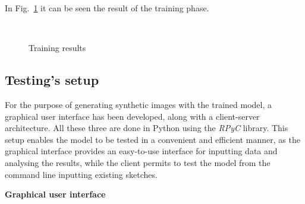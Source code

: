 \noindent In Fig.~\ref{fig:training results} it can be seen the result of the training phase.
\begin{figure}[htbp]
    \centering
     \quad
    \\
    \caption{Training results}
    \label{fig:training results}
\end{figure}
%
%
\subsection{Testing's setup}
\label{sec:testing setup}
For the purpose of generating synthetic images with the trained model, a graphical user interface has been developed, along with a client-server architecture. All these three are done in Python using the \textit{RPyC} library. This setup enables the model to be tested in a convenient and efficient manner, as the graphical interface provides an easy-to-use interface for inputting data and analysing the results, while the client permits to test the model from the command line inputting existing sketches.
\newline

\noindent \textbf{Graphical user interface}

